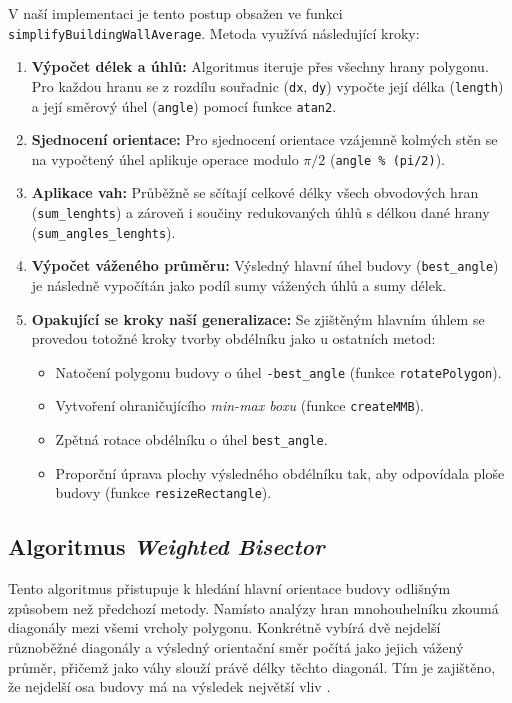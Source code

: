 \documentclass[12pt, a4paper]{article}
\begin{document}
V naší implementaci je tento postup obsažen ve funkci \texttt{simplifyBuildingWallAverage}. Metoda využívá následující kroky:

\begin{enumerate}
    \item \textbf{Výpočet délek a úhlů:} Algoritmus iteruje přes všechny hrany polygonu. Pro každou hranu se z rozdílu souřadnic (\texttt{dx}, \texttt{dy}) vypočte její délka (\texttt{length}) a její směrový úhel (\texttt{angle}) pomocí funkce \texttt{atan2}.
    \item \textbf{Sjednocení orientace:} Pro sjednocení orientace vzájemně kolmých stěn se na vypočtený úhel aplikuje operace modulo $\pi/2$ (\texttt{angle \% (pi/2)}).
    \item \textbf{Aplikace vah:} Průběžně se sčítají celkové délky všech obvodových hran (\texttt{sum\_lenghts}) a zároveň i součiny redukovaných úhlů s délkou dané hrany (\texttt{sum\_angles\_lenghts}). 
    \item \textbf{Výpočet váženého průměru:} Výsledný hlavní úhel budovy (\texttt{best\_angle}) je následně vypočítán jako podíl sumy vážených úhlů a sumy délek.
    \item \textbf{Opakující se kroky naší generalizace:} Se zjištěným hlavním úhlem se provedou totožné kroky tvorby obdélníku jako u ostatních metod:
    \begin{itemize}
        \item Natočení polygonu budovy o úhel \texttt{-best\_angle} (funkce \texttt{rotatePolygon}).
        \item Vytvoření ohraničujícího \textit{min-max boxu} (funkce \texttt{createMMB}).
        \item Zpětná rotace obdélníku o úhel \texttt{best\_angle}.
        \item Proporční úprava plochy výsledného obdélníku tak, aby odpovídala ploše budovy (funkce \texttt{resizeRectangle}).
    \end{itemize}
\end{enumerate}

\subsection{Algoritmus \textit{Weighted Bisector}}
Tento algoritmus přistupuje k hledání hlavní orientace budovy odlišným způsobem než předchozí metody. Namísto analýzy hran mnohouhelníku zkoumá diagonály mezi všemi vrcholy polygonu. Konkrétně vybírá dvě nejdelší různoběžné diagonály a výsledný orientační směr počítá jako jejich vážený průměr, přičemž jako váhy slouží právě délky těchto diagonál. Tím je zajištěno, že nejdelší osa budovy má na výsledek největší vliv \parencite{bayer}.
\end{document}
